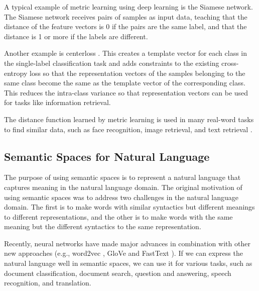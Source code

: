 A typical example of metric learning using deep learning is the Siamese network. The Siamese network receives pairs of samples as input data, teaching that the distance of the feature vectors is 0 if the pairs are the same label, and that the distance is 1 or more if the labels are different.

Another example is centerloss \cite{wen2016discriminative}. This creates a template vector for each class in the single-label classification task and adds constraints to the existing cross-entropy loss so that the representation vectors of the samples belonging to the same class become the same as the template vector of the corresponding class. This reduces the intra-class variance so that representation vectors can be used for tasks like information retrieval.

The distance function learned by metric learning is used in many real-word tasks to find similar data, such as face recognition, image retrieval, and text retrieval \cite{sun2014deep, huang2013learning, wan2014deep}.


\subsection{Semantic Spaces for Natural Language}

The purpose of using semantic spaces is to represent a natural language that captures meaning in the natural language domain. The original motivation of using semantic spaces was to address two challenges in the natural language domain. The first is to make words with similar syntactics but different meanings to different representations, and the other is to make words with the same meaning but the different syntactics to the same representation.

Recently, neural networks have made major advances in combination with other new approaches (e.g., word2vec \cite{mikolov2013efficient},  GloVe \cite{pennington2014glove} and FastText \cite{joulin2016fasttext}). If we can express the natural language well in semantic spaces, we can use it for various tasks, such as document classification, document search, question and answering, speech recognition, and translation.


